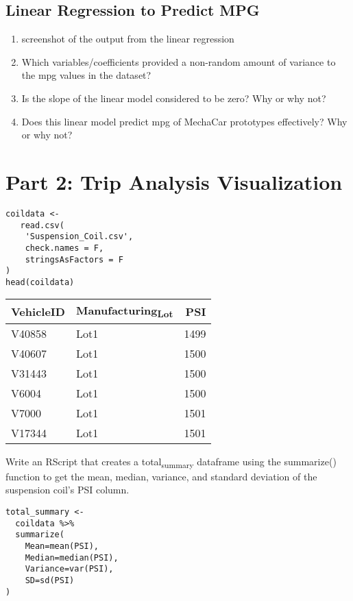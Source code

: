 \documentclass[11pt]{article}
\begin{document}
\subsection{Linear Regression to Predict MPG}
\label{sec:org3c2894e}

\begin{enumerate}
\item screenshot of the output from the linear regression
\item Which variables/coefficients provided a non-random amount of variance to the mpg values in the dataset?
\item Is the slope of the linear model considered to be zero? Why or why not?
\item Does this linear model predict mpg of MechaCar prototypes effectively? Why or why not?
\end{enumerate}


\section{Part 2: Trip Analysis Visualization}
\label{sec:orgd1085a7}

\begin{verbatim}
coildata <-
   read.csv(
    'Suspension_Coil.csv',
    check.names = F,
    stringsAsFactors = F
)
head(coildata)
\end{verbatim}

\begin{org}
\begin{center}
\begin{tabular}{llr}
VehicleID & Manufacturing\textsubscript{Lot} & PSI\\
\hline
V40858 & Lot1 & 1499\\
V40607 & Lot1 & 1500\\
V31443 & Lot1 & 1500\\
V6004 & Lot1 & 1500\\
V7000 & Lot1 & 1501\\
V17344 & Lot1 & 1501\\
\end{tabular}
\end{center}
\end{org}

Write an RScript that creates a total\textsubscript{summary} dataframe using the summarize() function to get the mean, median, variance, and standard deviation of the suspension coil’s PSI column.

\begin{verbatim}
total_summary <-
  coildata %>%
  summarize(
    Mean=mean(PSI),
    Median=median(PSI),
    Variance=var(PSI),
    SD=sd(PSI)
)
\end{verbatim}
\end{document}
